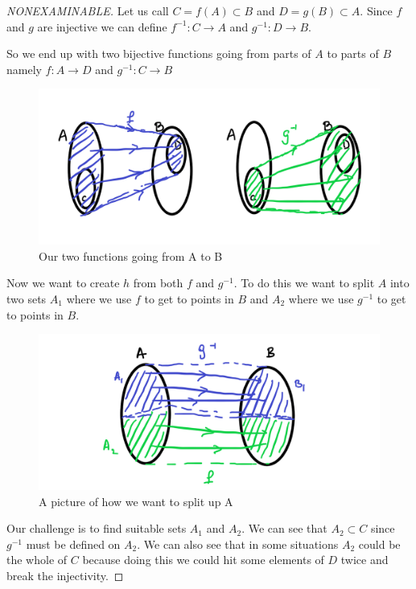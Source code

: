 \documentclass[
]{book}
\theoremstyle{definition}
\theoremstyle{definition}
\theoremstyle{definition}
\theoremstyle{definition}
\theoremstyle{remark}
\begin{document}
\begin{proof}[NONEXAMINABLE]
Let us call \(C = f(A) \subset B\) and \(D = g(B) \subset A\). Since \(f\) and \(g\) are injective we can define \(f^{-1}:C \rightarrow A\) and \(g^{-1}: D \rightarrow B\).

So we end up with two bijective functions going from parts of \(A\) to parts of \(B\) namely \(f: A \rightarrow D\) and \(g^{-1}: C \rightarrow B\)

\begin{figure}
\centering
\includegraphics{CBS1.png}
\caption{\label{fig:unnamed-chunk-21}Our two functions going from A to B}
\end{figure}

Now we want to create \(h\) from both \(f\) and \(g^{-1}\). To do this we want to split \(A\) into two sets \(A_1\) where we use \(f\) to get to points in \(B\) and \(A_2\) where we use \(g^{-1}\) to get to points in \(B\).

\begin{figure}
\centering
\includegraphics{CBS2.png}
\caption{\label{fig:unnamed-chunk-22}A picture of how we want to split up A}
\end{figure}

Our challenge is to find suitable sets \(A_1\) and \(A_2\). We can see that \(A_2 \subset C\) since \(g^{-1}\) must be defined on \(A_2\). We can also see that in some situations \(A_2\) could be the whole of \(C\) because doing this we could hit some elements of \(D\) twice and break the injectivity.


\end{proof}
\end{document}

